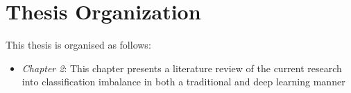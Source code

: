 \section{Thesis Organization}\label{sec:ThOrg} 
This thesis is organised as follows:

\begin{itemize}
\item {\it Chapter 2}: This chapter presents a literature review of the current research into classification imbalance in both a traditional and deep learning manner



\end{itemize}










